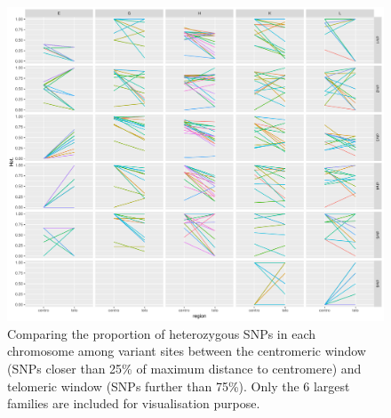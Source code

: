 \documentclass[10pt,a4paper]{report}
\begin{document}
\begin{figure}[h]
	\begin{center}
		\includegraphics[width=1\textwidth]{Num_CSD_loci/line_centro25_telo_chr_fam.pdf}
		\caption{Comparing the proportion of heterozygous SNPs in each chromosome among variant sites between the centromeric window (SNPs closer than 25\% of maximum distance to centromere) and telomeric window (SNPs further than 75\%). Only the 6 largest families are included for visualisation purpose.}
		\label{cen_tel_chr}
	\end{center}
\end{figure}
\end{document}
